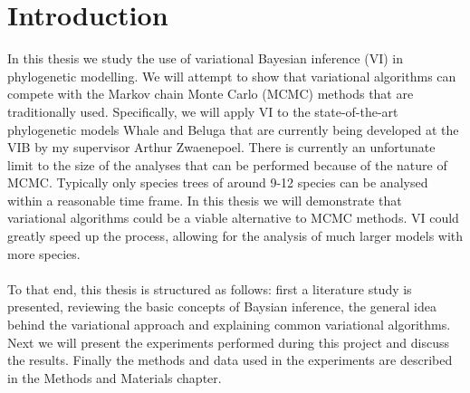\chapter{Introduction}

In this thesis we study the use of variational Bayesian inference (VI) in phylogenetic modelling. We will attempt to show that variational algorithms can compete with the Markov chain Monte Carlo (MCMC) methods that are traditionally used. Specifically, we will apply VI to the state-of-the-art phylogenetic models Whale and Beluga that are currently being developed at the VIB by my supervisor Arthur Zwaenepoel. There is currently an unfortunate limit to the size of the analyses that can be performed because of the nature of MCMC. Typically only species trees of around 9-12 species can be analysed within a reasonable time frame. In this thesis we will demonstrate that variational algorithms could be a viable alternative to MCMC methods. VI could greatly speed up the process, allowing for the analysis of much larger models with more species. 
\\
\\
To that end, this thesis is structured as follows: first a literature study is presented, reviewing the basic concepts of Baysian inference, the general idea behind the variational approach and explaining common variational algorithms. Next we will present the experiments performed during this project and discuss the results. Finally the methods and data used in the experiments are described in the Methods and Materials chapter.
